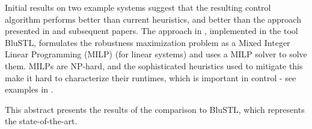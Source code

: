 
Initial results on two example systems suggest that the resulting control algorithm performs better than current heuristics, and better than the approach presented in \cite{Raman14_MPCSTL} and subsequent papers.
The approach in \cite{Raman14_MPCSTL}, implemented in the tool BluSTL, formulates the robustness maximization problem as a Mixed Integer Linear Programming (MILP) (for linear systems) and uses a MILP solver to solve them.
MILPs are NP-hard, and the sophisticated heuristics used to mitigate this make it hard to characterize their runtimes, which is important in control - see examples in \cite{Raman14_MPCSTL}.

This abstract presents the results of the comparison to BluSTL, which represents the state-of-the-art.

